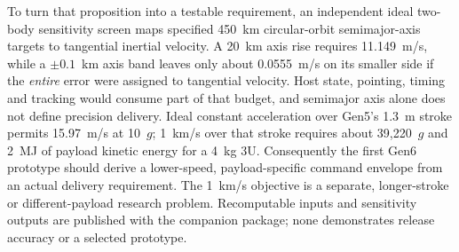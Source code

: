 \documentclass[conference]{IEEEtran}
\begin{document}
To turn that proposition into a testable requirement, an independent ideal two-body sensitivity screen maps specified 450~km circular-orbit semimajor-axis targets to tangential inertial velocity. A 20~km axis rise requires 11.149~m/s, while a $\pm0.1$~km axis band leaves only about 0.0555~m/s on its smaller side if the \emph{entire} error were assigned to tangential velocity. Host state, pointing, timing and tracking would consume part of that budget, and semimajor axis alone does not define precision delivery. Ideal constant acceleration over Gen5's 1.3~m stroke permits 15.97~m/s at 10~$g$; 1~km/s over that stroke requires about 39{,}220~$g$ and 2~MJ of payload kinetic energy for a 4~kg 3U. Consequently the first Gen6 prototype should derive a lower-speed, payload-specific command envelope from an actual delivery requirement. The 1~km/s objective is a separate, longer-stroke or different-payload research problem. Recomputable inputs and sensitivity outputs are published with the companion package; none demonstrates release accuracy or a selected prototype.
\end{document}
